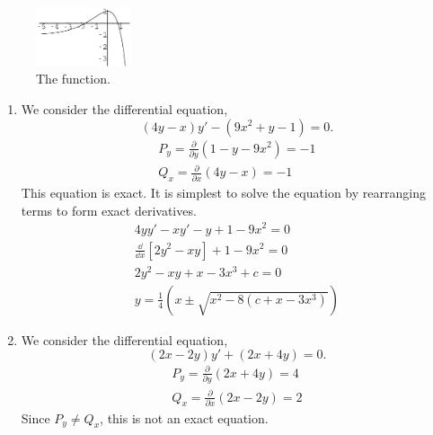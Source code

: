 {\begin{Solution}
\begin{enumerate}
      \begin{figure}[tb!]
        \begin{center}
          \includegraphics[width=0.25\textwidth]{ode/first_order/21xex1}
        \end{center}
        \caption{The function.}
        \label{21xex1}
      \end{figure}
    \end{enumerate}
  \end{Solution}










  \begin{Solution}
    \label{solution 4yxy9x2y10}
    \begin{enumerate}
    \item
      We consider the differential equation,
      \[
      (4 y - x) y' - (9 x^2 + y - 1) = 0.
      \]
      \begin{gather*}
        P_y = \frac{\partial}{\partial y} \left( 1 - y - 9 x^2 \right) = -1 \\
        Q_x = \frac{\partial}{\partial x} \left( 4 y - x \right) = -1
      \end{gather*}
      This equation is exact.  It is simplest to solve the equation by rearranging
      terms to form exact derivatives.
      \begin{gather*}
        4 y y' - x y' - y + 1 - 9 x^2 = 0 \\
        \frac{\dd}{\dd x} \left[ 2 y^2 - x y \right] + 1 - 9 x^2 = 0 \\
        2 y^2 - x y + x - 3 x^3 + c = 0 \\
        \boxed{
          y = \frac{1}{4} \left( x \pm \sqrt{x^2 - 8 ( c + x - 3 x^3 ) } \right)
          }
      \end{gather*}
    \item
      We consider the differential equation,
      \[
      (2 x - 2 y) y' + (2 x + 4 y) = 0.
      \]
      \begin{gather*}
        P_y = \frac{\partial}{\partial y} \left( 2 x + 4 y \right) = 4 \\
        Q_x = \frac{\partial}{\partial x} \left( 2 x - 2 y \right) = 2
      \end{gather*}
      Since $P_y \neq Q_x$, this is not an exact equation.
    \end{enumerate}
  \end{Solution}










}
